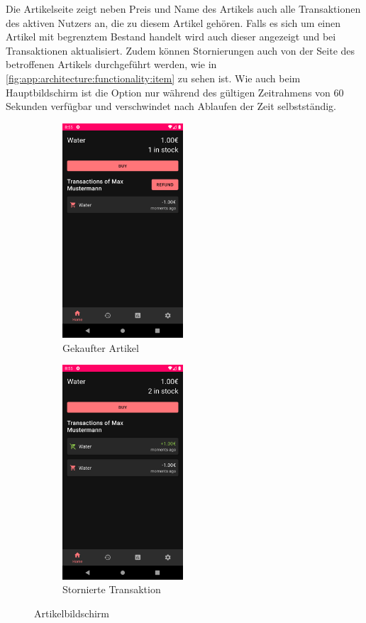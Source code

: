 \documentclass[a4paper, 11pt]{article}
\begin{document}
Die Artikelseite zeigt neben Preis und Name des Artikels auch alle Transaktionen des aktiven Nutzers an, die zu diesem Artikel gehören.
Falls es sich um einen Artikel mit begrenztem Bestand handelt wird auch dieser angezeigt und bei Transaktionen aktualisiert.
Zudem können Stornierungen auch von der Seite des betroffenen Artikels durchgeführt werden, wie in \autoref{fig:app:architecture:functionality:item} zu sehen ist.
Wie auch beim Hauptbildschirm ist die Option nur während des gültigen Zeitrahmens von 60 Sekunden verfügbar und verschwindet nach Ablaufen der Zeit selbstständig.
\begin{figure}[]
	\begin{subfigure}{.5\textwidth}
		\centering
		\includegraphics[height=8cm,keepaspectratio]{./images/screenshots/item-purchased.png}
		\caption{Gekaufter Artikel}
		\label{fig:app:architecture:functionality:item:purchase}
	\end{subfigure}
	\begin{subfigure}{.5\textwidth}
		\centering
		\includegraphics[height=8cm,keepaspectratio]{./images/screenshots/item-refunded.png}
		\caption{Stornierte Transaktion}
		\label{fig:app:architecture:functionality:item:refund}
	\end{subfigure}
	\caption{Artikelbildschirm}
	\label{fig:app:architecture:functionality:item}
\end{figure}
\end{document}
